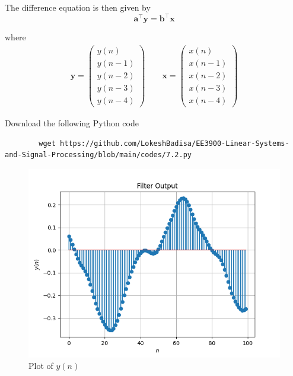 \documentclass[journal,12pt,twocolumn]{IEEEtran}
\let\vec\mathbf
\numberwithin{equation}{section}
\renewcommand\thesection{\arabic{section}}
\newcommand{\myvec}[1]{\ensuremath{\begin{pmatrix}#1\end{pmatrix}}}
\begin{document}
\begin{enumerate}[label=\thesection.\arabic*]
	The difference equation is then given by
	\begin{equation}
		\vec{a}^\top \vec{y} = \vec{b}^\top \vec{x} 
	\end{equation}
	
	where
	\begin{align}
		\vec{y} = \myvec{y(n) \\ y(n-1) \\ y(n-2) \\ y(n-3) \\ y(n-4)} \qquad
		\vec{x} = \myvec{x(n) \\ x(n-1) \\ x(n-2) \\ x(n-3) \\ x(n-4)}
	\end{align}
	
	Download the following Python code
	\begin{lstlisting}
		wget https://github.com/LokeshBadisa/EE3900-Linear-Systems-and-Signal-Processing/blob/main/codes/7.2.py
	\end{lstlisting}
	
	\begin{figure}[!ht]
		\centering
		\includegraphics[width=\columnwidth]{./figs/7.2.1.png}
		\caption{Plot of $y(n)$}
		\label{fig-7.2.1}	
	\end{figure}
	

\end{enumerate}
\end{document}

